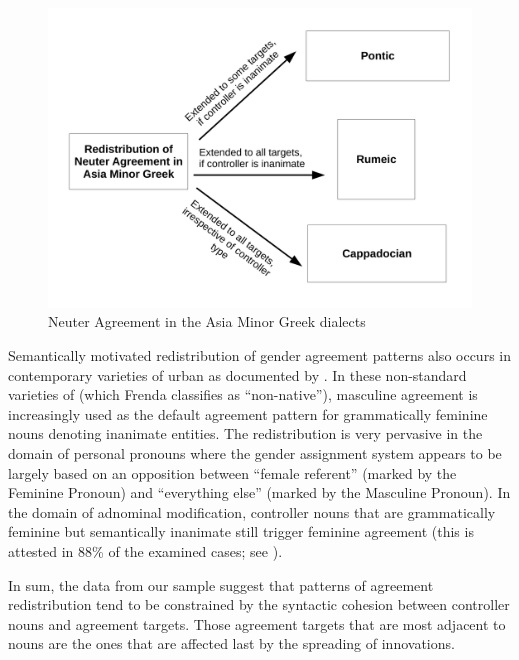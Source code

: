 \documentclass[output=collectionpaper]{langsci/langscibook}
\begin{document}
\begin{figure}
\includegraphics[height=.4\textheight]{figures/11/AMG}
\caption{Neuter Agreement in the Asia Minor Greek dialects}
\label{fig:dgm:AMG}
\end{figure}

Semantically motivated redistribution of gender agreement patterns also occurs in contemporary varieties of urban  as documented by \citet{Frenda2011}. In these non-standard varieties of  (which Frenda classifies as ``non-native''), masculine agreement is increasingly used as the default agreement pattern for grammatically feminine nouns denoting inanimate entities. The redistribution is very pervasive in the domain of personal pronouns where the gender assignment system appears to be largely based on an opposition between ``female referent'' (marked by the Feminine Pronoun) and ``everything else'' (marked by the Masculine Pronoun). In the domain of adnominal modification,  controller nouns that are grammatically feminine but semantically inanimate still trigger feminine agreement (this is attested in 88\% of the examined cases; see \citealt[17, Figure 1]{Frenda2011}).

In sum, the data from our sample suggest that patterns of agreement redistribution tend to be constrained by the syntactic cohesion between controller nouns and agreement targets. Those agreement targets that are most adjacent to nouns are the ones that are affected last by the spreading of innovations.
\end{document}
